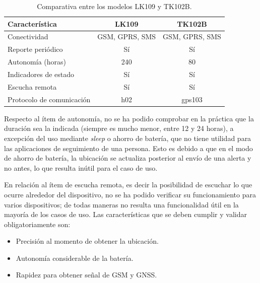 \begin{table}[H]
	\centering
	\caption[Comparativa entre los modelos LK109 y TK102B.]{Comparativa entre los modelos LK109 y TK102B.}
	\begin{tabular}{l c c}    
		\toprule
		\textbf{Característica} 	 & \textbf{LK109} & \textbf{TK102B}	  \\
		\midrule
		Conectividad & GSM, GPRS, SMS & 	GSM, GPRS, SMS			\\		
		Reporte periódico & Sí & Sí			\\
		Autonomía (horas) & 240 & 80		\\
		Indicadores de estado & Sí & Sí \\
		Escucha remota & Sí & Sí \\
		Protocolo de comunicación & h02 & gps103 \\
		\bottomrule
		\hline
	\end{tabular}
	\label{tab:comparativa-botones}
\end{table}

Respecto al ítem de autonomía, no se ha podido comprobar en la práctica que la duración sea la indicada (siempre es mucho menor, entre 12 y 24 horas), a excepción del uso mediante \textit{sleep} o ahorro de batería, que no tiene utilidad para las aplicaciones de seguimiento de una persona. Esto es debido a que en el modo de ahorro de batería, la ubicación se actualiza posterior al envío de una alerta y no antes, lo que resulta inútil para el caso de uso.

En relación al ítem de escucha remota, es decir la posibilidad de escuchar lo que ocurre alrededor del dispositivo, no se ha podido verificar su funcionamiento para varios dispositivos; de todas maneras no resulta una funcionalidad útil en la mayoría de los casos de uso. Las características que se deben cumplir y validar obligatoriamente son:
\begin{itemize}
	\item Precisión al momento de obtener la ubicación.
	\item Autonomía considerable de la batería.
	\item Rapidez para obtener señal de GSM y GNSS.
\end{itemize}